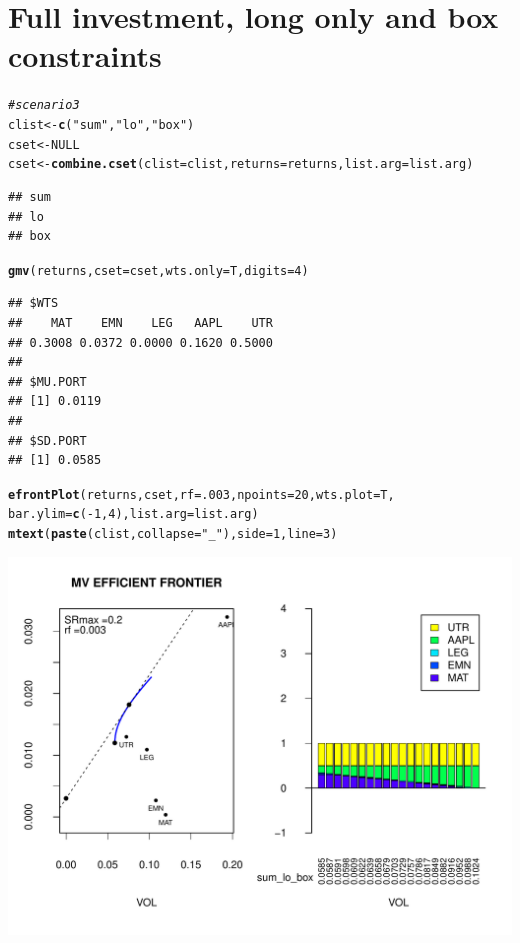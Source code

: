 \documentclass{uwstat518}\usepackage[]{graphicx}\usepackage[]{color}
\makeatletter
\def\maxwidth{ %
  \ifdim\Gin@nat@width>\linewidth
    \linewidth
  \else
    \Gin@nat@width
  \fi
}
\newcommand{\hlstr}[1]{\textcolor[rgb]{0.192,0.494,0.8}{#1}}%
\newcommand{\hlcom}[1]{\textcolor[rgb]{0.678,0.584,0.686}{\textit{#1}}}%
\newcommand{\hlkwd}[1]{\textcolor[rgb]{0.737,0.353,0.396}{\textbf{#1}}}%
\newenvironment{kframe}{%
 \def\at@end@of@kframe{}%
 \ifinner\ifhmode%
  \def\at@end@of@kframe{\end{minipage}}%
  \begin{minipage}{\columnwidth}%
 \fi\fi%
 \def\FrameCommand##1{\hskip\@totalleftmargin \hskip-\fboxsep
 \colorbox{shadecolor}{##1}\hskip-\fboxsep
     \hskip-\linewidth \hskip-\@totalleftmargin \hskip\columnwidth}%
 \MakeFramed {\advance\hsize-\width
   \@totalleftmargin\z@ \linewidth\hsize
   \@setminipage}}%
 {\par\unskip\endMakeFramed%
 \at@end@of@kframe}
\newenvironment{knitrout}{}{} %
\makeatother
\begin{document}
\section{Full investment, long only and box constraints}
\begin{knitrout}
\color{fgcolor}\begin{kframe}
\begin{alltt}
\hlcom{# scenario 3}
clist <- \hlkwd{c}(\hlstr{"sum"},\hlstr{"lo"},\hlstr{"box"})
cset <- NULL
cset <-\hlkwd{combine.cset}(clist=clist,returns=returns,list.arg=list.arg)
\end{alltt}
\begin{verbatim}
## sum 
## lo 
## box
\end{verbatim}
\begin{alltt}
\hlkwd{gmv}(returns, cset=cset, wts.only=T,digits=4)
\end{alltt}
\begin{verbatim}
## $WTS
##    MAT    EMN    LEG   AAPL    UTR 
## 0.3008 0.0372 0.0000 0.1620 0.5000 
## 
## $MU.PORT
## [1] 0.0119
## 
## $SD.PORT
## [1] 0.0585
\end{verbatim}
\begin{alltt}
\hlkwd{efrontPlot}(returns, cset, rf = .003, npoints = 20,wts.plot = T,
		bar.ylim = \hlkwd{c}(-1,4),list.arg=list.arg)
\hlkwd{mtext}(\hlkwd{paste}(clist,collapse=\hlstr{"_"}),side=1,line=3)
\end{alltt}
\end{kframe}
\includegraphics[width=\maxwidth]{figure/unnamed-chunk-6} 

\end{knitrout}
\end{document}
